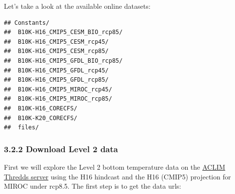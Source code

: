 \documentclass[
]{article}
\newenvironment{Shaded}{\begin{snugshade}}{\end{snugshade}}
\newcommand{\CharTok}[1]{\textcolor[rgb]{0.31,0.60,0.02}{#1}}
\newcommand{\CommentTok}[1]{\textcolor[rgb]{0.56,0.35,0.01}{\textit{#1}}}
\newcommand{\DataTypeTok}[1]{\textcolor[rgb]{0.13,0.29,0.53}{#1}}
\newcommand{\KeywordTok}[1]{\textcolor[rgb]{0.13,0.29,0.53}{\textbf{#1}}}
\newcommand{\NormalTok}[1]{#1}
\newcommand{\OperatorTok}[1]{\textcolor[rgb]{0.81,0.36,0.00}{\textbf{#1}}}
\newcommand{\StringTok}[1]{\textcolor[rgb]{0.31,0.60,0.02}{#1}}
\begin{document}
Let's take a look at the available online datasets:

\begin{Shaded}
\end{Shaded}

\begin{verbatim}
## Constants/ 
##  B10K-H16_CMIP5_CESM_BIO_rcp85/ 
##  B10K-H16_CMIP5_CESM_rcp45/ 
##  B10K-H16_CMIP5_CESM_rcp85/ 
##  B10K-H16_CMIP5_GFDL_BIO_rcp85/ 
##  B10K-H16_CMIP5_GFDL_rcp45/ 
##  B10K-H16_CMIP5_GFDL_rcp85/ 
##  B10K-H16_CMIP5_MIROC_rcp45/ 
##  B10K-H16_CMIP5_MIROC_rcp85/ 
##  B10K-H16_CORECFS/ 
##  B10K-K20_CORECFS/ 
##  files/
\end{verbatim}

\hypertarget{download-level-2-data}{%
\subsubsection{3.2.2 Download Level 2
data}\label{download-level-2-data}}

First we will explore the Level 2 bottom temperature data on the
\href{https://data.pmel.noaa.gov/aclim/thredds/}{ACLIM Thredds server}
using the H16 hindcast and the H16 (CMIP5) projection for MIROC under
rcp8.5. The first step is to get the data urls:
\end{document}
